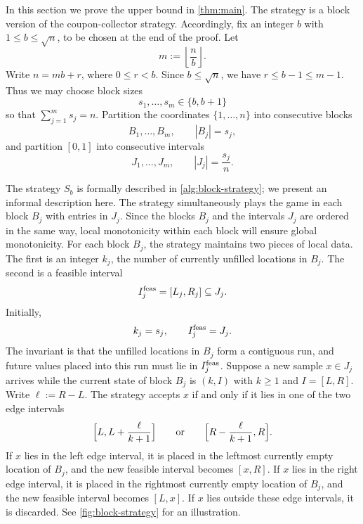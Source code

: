 \documentclass[11pt,reqno,letterpaper]{amsart}
\theoremstyle{definition}
\numberwithin{equation}{section}
\newcommand{\floor}[1]{\left\lfloor #1 \right\rfloor}
\begin{document}
In this section we prove the upper bound in \cref{thm:main}. The strategy is a block version of the coupon-collector strategy. 
Accordingly, fix an integer \(b\) with \(1\le b\le \sqrt n\), to be chosen at the end of the proof. Let
\[
m:=\floor{\frac nb}.
\]
Write \(n=mb+r\), where \(0\le r<b\). Since \(b\le \sqrt n\), we have \(r\le b-1\le m-1\). Thus we may choose block sizes
\[
s_1,\dots,s_m\in\{b,b+1\}
\]
so that \(\sum_{j=1}^m s_j=n\). 
Partition the coordinates \(\{1,\dots,n\}\) into consecutive blocks
\[
B_1,\dots,B_m,
\qquad
|B_j|=s_j,
\]
and partition \([0,1]\) into consecutive intervals
\[
J_1,\dots,J_m,
\qquad
|J_j|=\frac{s_j}{n}.
\]


The strategy $S_b$ is formally described in \cref{alg:block-strategy}; we present an informal description here. The strategy simultaneously plays the game in each block $B_j$ with entries in $J_j$.  Since the blocks $B_j$ and the intervals $J_j$ are ordered in the same way, local monotonicity within each block will ensure global monotonicity. For each block \(B_j\), the strategy maintains two pieces of local data. The first is an integer \(k_j\), the number of currently unfilled locations in \(B_j\). The second is a feasible interval
\[
I_j^{\rm feas}=[L_j,R_j]\subseteq J_j.
\]
Initially,
\[
k_j=s_j,
\qquad
I_j^{\rm feas}=J_j.
\]
The invariant is that the unfilled locations in \(B_j\) form a contiguous run, and future values placed into this run must lie in \(I_j^{\rm feas}\). Suppose a new sample $x\in J_j$ arrives while the current state of block $B_j$ is $(k,I)$ with $k\geq 1$ and $I=[L,R]$. Write $\ell:=R-L$. The strategy accepts $x$ if and only if it lies in one of the two edge intervals
\[
\Bigl[L,L+\frac{\ell}{k+1}\Bigr]
\qquad\text{or}\qquad
\Bigl[R-\frac{\ell}{k+1},R\Bigr].
\]
If $x$ lies in the left edge interval, it is placed in the leftmost currently empty location of $B_j$, and the new feasible interval becomes $[x,R]$. If $x$ lies in the right edge interval, it is placed in the rightmost currently empty location of $B_j$, and the new feasible interval becomes $[L,x]$. If $x$ lies outside these edge intervals, it is discarded. See \cref{fig:block-strategy} for an illustration.
\end{document}
